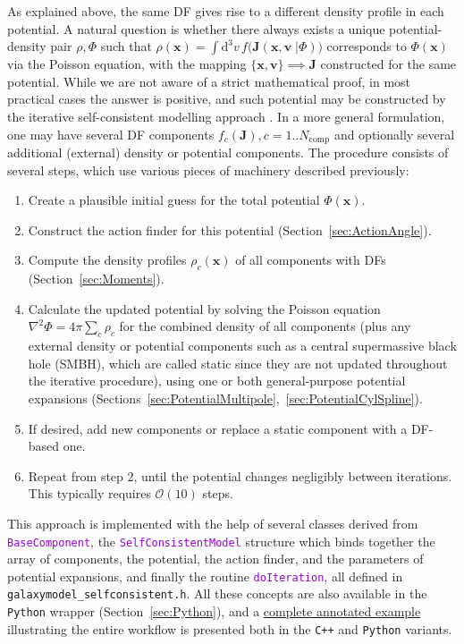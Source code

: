 \documentclass[12pt]{article}
\newcommand{\Cpp}  {\texttt{C++}\xspace}
\newcommand{\Python}{\texttt{Python}\xspace}
\newcommand{\ttt}[1]{\textcolor{darkviolet}{\texttt{#1}}}
\renewcommand{\d}{\mathrm{d}}
\newcommand{\bv}{\boldsymbol{v}}
\newcommand{\bx}{\boldsymbol{x}}
\newcommand{\bJ}{\boldsymbol{J}}
\begin{document}
As explained above, the same DF gives rise to a different density profile in each potential. A natural question is whether there always exists a unique potential-density pair $\rho,\Phi$ such that $\rho(\bx)=\int \d ^3v\,f\big(\bJ(\bx,\bv\;|\Phi)\big)$ corresponds to $\Phi(\bx)$ via the Poisson equation, with the mapping $\{\bx,\bv\}\implies \bJ$ constructed for the same potential.
While we are not aware of a strict mathematical proof, in most practical cases the answer is positive, and such potential may be constructed by the iterative self-consistent modelling approach \cite{Binney2014,Piffl2015}. 
In a more general formulation, one may have several DF components $f_c(\bJ), c=1..N_\mathrm{comp}$ and optionally several additional (external) density or potential components. The procedure consists of several steps, which use various pieces of machinery described previously:
\begin{enumerate}  \setlength{\parskip}{2pt} \setlength{\itemsep}{2pt}
\item Create a plausible initial guess for the total potential $\Phi(\bx)$.
\item Construct the action finder for this potential (Section~\ref{sec:ActionAngle}).
\item Compute the density profiles $\rho_c(\bx)$ of all components with DFs (Section~\ref{sec:Moments}).
\item Calculate the updated potential by solving the Poisson equation $\nabla^2\Phi = 4\pi\sum_c\rho_c$ for the combined density of all components (plus any external density or potential components such as a central supermassive black hole (SMBH), which are called static since they are not updated throughout the iterative procedure), using one or both general-purpose potential expansions (Sections~\ref{sec:PotentialMultipole},~\ref{sec:PotentialCylSpline}).
\item If desired, add new components or replace a static component with a DF-based one.
\item Repeat from step 2, until the potential changes negligibly between iterations. This typically requires $\mathcal{O}(10)$ steps.
\end{enumerate}

This approach is implemented with the help of several classes derived from \ttt{BaseComponent}, the \ttt{SelfConsistentModel} structure which binds together the array of components, the potential, the action finder, and the parameters of potential expansions, and finally the routine \ttt{doIteration}, all defined in \texttt{galaxymodel_selfconsistent.h}. All these concepts are also available in the \Python wrapper (Section~\ref{sec:Python}), and a \hyperref[sec:ExampleSCM]{complete annotated example} illustrating the entire workflow is presented both in the \Cpp and \Python variants.
\end{document}
